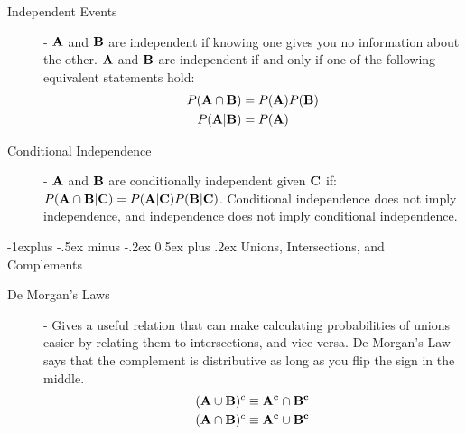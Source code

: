 \documentclass[10pt,landscape]{article}
\makeatletter
\theoremstyle{definition}
\renewcommand{\subsection}{\@startsection{subsection}{2}{0mm}%
                                {-1explus -.5ex minus -.2ex}%
                                {0.5ex plus .2ex}%
                                {\normalfont\normalsize\bfseries}}
\makeatother
\begin{document}
\begin{multicols}{3}
    \begin{description}
        \item[Independent Events] - ${\bf A}$ and ${\bf B}$ are independent if knowing one gives you no information about the other. ${\bf A}$ and ${\bf B}$ are independent if and only if one of the following equivalent statements hold: 
           \begin{align*} 
            P({\bf A}\cap {\bf B}) &= P({\bf A})P({\bf B}) \\
            P({\bf A}|{\bf B}) &= P({\bf A})
           \end{align*}
        \item[Conditional Independence] - ${\bf A}$ and ${\bf B}$ are conditionally independent given ${\bf C}$ if: $P({\bf A}\cap {\bf B}|{\bf C}) = P({\bf A}|{\bf C})P({\bf B}|{\bf C})$. Conditional independence does not imply independence, and independence does not imply conditional independence.
    \end{description}
    
\subsection{Unions, Intersections, and Complements}

    \begin{description}

        \item[De Morgan's Laws] - Gives a useful relation that can make calculating probabilities of unions easier by relating them to intersections, and vice versa. De Morgan's Law says that the complement is distributive as long as you flip the sign in the middle.
           \begin{align*} 
        ({\bf A} \cup {\bf B})^c \equiv {\bf A^c} \cap {\bf B^c} \\
        ({\bf A} \cap {\bf B})^c \equiv {\bf A^c} \cup {\bf B^c}
           \end{align*} 
                  


\end{description}
\end{multicols}
\end{document}

